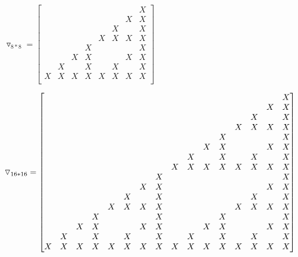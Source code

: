 \documentclass[10pt]{book}
\begin{document}
\begin{mdSnippets}
\begin{mdInlineSnippet}[dc9d44ff115ca99326e61400a89a3894]%
$\triangledown_{8*8}=\begin{bmatrix}&   &   &   &   &   &   & X\\&   &   &   &   &   & X & X\\&   &   &   &   & X &   & X\\&   &   &   & X & X & X & X\\&   &   & X &   &   &   & X\\&   & X & X &   &   & X & X\\& X &   & X &   & X &   & X\\X & X & X & X & X & X & X & X\\\end{bmatrix}$\end{mdInlineSnippet}%
\begin{mdInlineSnippet}[2494d7a17b5f80e147f6e53e301b252c]%
$\setcounter{MaxMatrixCols}{20}\triangledown_{16*16}=\begin{bmatrix}&   &   &   &   &   &   &   &   &   &   &   &   &   &   & X\\&   &   &   &   &   &   &   &   &   &   &   &   &   & X & X\\&   &   &   &   &   &   &   &   &   &   &   &   & X &   & X\\&   &   &   &   &   &   &   &   &   &   &   & X & X & X & X\\&   &   &   &   &   &   &   &   &   &   & X &   &   &   & X\\&   &   &   &   &   &   &   &   &   & X & X &   &   & X & X\\&   &   &   &   &   &   &   &   & X &   & X &   & X &   & X\\&   &   &   &   &   &   &   & X & X & X & X & X & X & X & X\\&   &   &   &   &   &   & X &   &   &   &   &   &   &   & X\\&   &   &   &   &   & X & X &   &   &   &   &   &   & X & X\\&   &   &   &   & X &   & X &   &   &   &   &   & X &   & X\\&   &   &   & X & X & X & X &   &   &   &   & X & X & X & X\\&   &   & X &   &   &   & X &   &   &   & X &   &   &   & X\\&   & X & X &   &   & X & X &   &   & X & X &   &   & X & X\\& X &   & X &   & X &   & X &   & X &   & X &   & X &   & X\\X & X & X & X & X & X & X & X & X & X & X & X & X & X & X & X\end{bmatrix}$\end{mdInlineSnippet}%

\end{mdSnippets}
\end{document}
